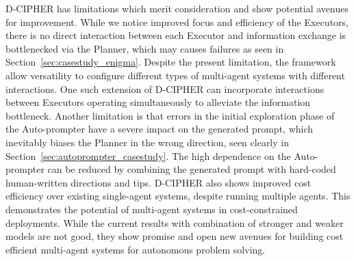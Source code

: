 D-CIPHER has limitations which merit consideration and show potential avenues for improvement.
While we notice improved focus and efficiency of the Executors, there is no direct interaction between each Executor and information exchange is bottlenecked via the Planner, which may causes failures as seen in Section~\ref{sec:casestudy_enigma}.
Despite the present limitation, the framework allow versatility to configure different types of multi-agent systems with different interactions. One such extension of D-CIPHER can incorporate interactions between Executors operating simultaneously to alleviate the information bottleneck.
Another limitation is that errors in the initial exploration phase of the Auto-prompter have a severe impact on the generated prompt, which inevitably biases the Planner in the wrong direction, seen clearly in Section~\ref{sec:autoprompter_casestudy}.
The high dependence on the Auto-prompter can be reduced by combining the generated prompt with hard-coded human-written directions and tips.
D-CIPHER also shows improved cost efficiency over existing single-agent systems, despite running multiple agents. This demonstrates the potential of multi-agent systems in cost-constrained deployments. While the current results with combination of stronger and weaker models are not good, they show promise and open new avenues for building cost efficient multi-agent systems for autonomous problem solving.


